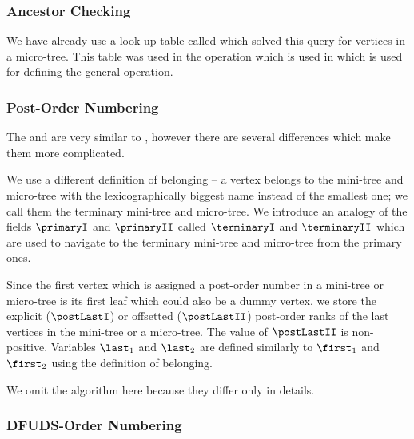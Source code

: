 \subsubsection{Ancestor Checking}

We have already use a look-up table called \isAncestor{} which solved this query for vertices in a micro-tree.
This table was used in the operation \subtreeSize{} which is used in \preRank{} which is used for defining the general \isAncestor{} operation.

\begin{algorithm}
\begin{algorithmic}
	\State {}
\EndFunction
\end{algorithmic}
\end{algorithm}

\subsubsection{Post-Order Numbering}

The \postRank{} and \postSelect{} are very similar to \preAny{}, however there are several differences which make them more complicated.

We use a different definition of belonging -- a vertex belongs to the mini-tree and micro-tree with the lexicographically biggest name instead of the smallest one; we call them the terminary mini-tree and micro-tree.
We introduce an analogy of the fields $\primaryI$ and $\primaryII$ called $\terminaryI$ and $\terminaryII$ which are used to navigate to the terminary mini-tree and micro-tree from the primary ones.

Since the first vertex which is assigned a post-order number in a mini-tree or micro-tree is its first leaf which could also be a dummy vertex, we store the explicit ($\postLastI$) or offsetted ($\postLastII$) post-order ranks of the last vertices in the mini-tree or a micro-tree.
The value of $\postLastII$ is non-positive.
Variables $\last_1$ and $\last_2$ are defined similarly to $\first_1$ and $\first_2$ using the definition of belonging.

We omit the algorithm here because they differ only in details.

\subsubsection{DFUDS-Order Numbering}

